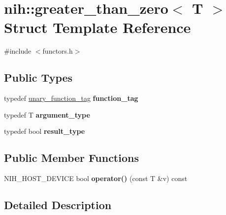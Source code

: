 \hypertarget{structnih_1_1greater__than__zero}{
\section{nih\-:\-:greater\-\_\-than\-\_\-zero$<$ \-T $>$ \-Struct \-Template \-Reference}
\label{structnih_1_1greater__than__zero}
}


{\ttfamily \#include $<$functors.\-h$>$}

\subsection*{\-Public \-Types}
\begin{DoxyCompactItemize}
\item 
\hypertarget{structnih_1_1greater__than__zero_ae5da52ac45e22f96928703dac144d6e6}{
typedef \hyperlink{structnih_1_1unary__function__tag}{unary\-\_\-function\-\_\-tag} {\bfseries function\-\_\-tag}}
\label{structnih_1_1greater__than__zero_ae5da52ac45e22f96928703dac144d6e6}

\item 
\hypertarget{structnih_1_1greater__than__zero_a50d3829e6b7d02c3a15cee3b1b189e99}{
typedef \-T {\bfseries argument\-\_\-type}}
\label{structnih_1_1greater__than__zero_a50d3829e6b7d02c3a15cee3b1b189e99}

\item 
\hypertarget{structnih_1_1greater__than__zero_ad422c9fb77147e8e17c67a18ca2e5ff0}{
typedef bool {\bfseries result\-\_\-type}}
\label{structnih_1_1greater__than__zero_ad422c9fb77147e8e17c67a18ca2e5ff0}

\end{DoxyCompactItemize}
\subsection*{\-Public \-Member \-Functions}
\begin{DoxyCompactItemize}
\item 
\hypertarget{structnih_1_1greater__than__zero_a59c8c6fdc04b2cd53f6591ed22f537f1}{
\-N\-I\-H\-\_\-\-H\-O\-S\-T\-\_\-\-D\-E\-V\-I\-C\-E bool {\bfseries operator()} (const \-T \&v) const }
\label{structnih_1_1greater__than__zero_a59c8c6fdc04b2cd53f6591ed22f537f1}

\end{DoxyCompactItemize}


\subsection{\-Detailed \-Description}
